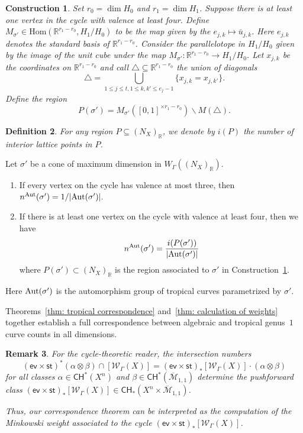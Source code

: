 \documentclass{article}
\def\oM{\overline{\mathcal{M}}}
\def\R{\mathbb{R}}
\def\Aut{{\rm Aut}}
\def\WG{\mathcal{W}_{\Gamma}}
\newtheorem{definition}{Definition}[section]
\newtheorem{remark}[definition]{Remark}
\newtheorem{construction}[definition]{Construction}
\newenvironment{customthm}[1]
{\renewcommand\theinnercustomthm{#1}\innercustomthm}
{\endinnercustomthm}
\newcommand{\nn}{n^{\operatorname{Aut}}}
\begin{document}
\begin{construction} \label{const: polytope}
     Set $r_0 = \dim H_0$ and $r_1 = \dim H_1$. Suppose there is at least one vertex in the cycle with valence at least four. Define $M_{\sigma'} \in \mathrm{Hom}(\R^{r_1-r_0}, H_1/H_0)$ to be the map given by the $e_{j,k} \mapsto \bar{u}_{j,k}$. Here $e_{j,k}$ denotes the standard basis of $\R^{r_1-r_0}$. Consider the parallelotope in $H_1/H_0$ given by the image of the unit cube under the map $M_{\sigma'}: \mathbb{R}^{r_1-r_0} \rightarrow H_1/H_0$. 
    Let $x_{j,k}$ be the coordinates on $\R^{r_1-r_0}$ and call $\triangle \subseteq \R^{r_1-r_0}$ the union of diagonals 
    $$\triangle = \bigcup_{1 \leq j \leq t, 1 \leq k,k' \leq e_j-1} \{x_{j,k} = x_{j,k'}\}.$$
    Define the region 
    $$P(\sigma') = M_{\sigma'}([0,1]^{ \times r_1-r_0}) \smallsetminus M(\triangle).$$     
\end{construction}



\begin{definition}
    For any region $P \subseteq (N_X)_{\mathbb{R}}$, we denote by $i(P)$ the number of interior lattice points in $P$. 
\end{definition}

\begin{customthm}{D}[Correspondence theorem, Part II] \label{thm: calculation of weights}
    Let $\sigma'$ be a cone of maximum dimension in $W_\Gamma((N_X)_\R)$. 
    \begin{enumerate}[label=(\alph*)]
        \item If every vertex on the cycle has valence at most three, then $\nn(\sigma') = 1/|\Aut(\sigma')|.$
        \item If there is at least one vertex on the cycle with valence at least four, then we have
    $$ \nn(\sigma') = \frac{i(P(\sigma'))}{|\Aut(\sigma')|}$$
    where $P(\sigma') \subset (N_X)_{\mathbb{R}}$ is the region associated to $\sigma'$ in Construction~\ref{const: polytope}.
    \end{enumerate}
    Here $\Aut(\sigma')$ is the automorphism group of tropical curves parametrized by $\sigma'$. 
\end{customthm}

Theorems~\ref{thm: tropical correspondence} and~\ref{thm: calculation of weights} together establish a full correspondence  between algebraic and tropical genus~$1$ curve counts in all dimensions.

\begin{remark}
For the cycle-theoretic reader, the intersection numbers
\[
(\mathsf{ev} \times \mathsf{st})^*(\alpha \otimes \beta) \cap [\WG(X)]
=
(\mathsf{ev} \times \mathsf{st})_*[\WG(X)] \cdot (\alpha \otimes \beta)
\]
for all classes $\alpha \in \mathsf{CH}^*(X^n)$ and $\beta \in \mathsf{CH}^*(\oM_{1,1})$ determine the pushforward class
$(\mathsf{ev} \times \mathsf{st})_*[\WG(X)] \in \mathsf{CH}_*(X^n \times \oM_{1,1})$.

Thus, our correspondence theorem can be interpreted as the computation of the Minkowski weight associated to the cycle $(\mathsf{ev} \times \mathsf{st})_*[\WG(X)]$.
\end{remark}
\end{document}
